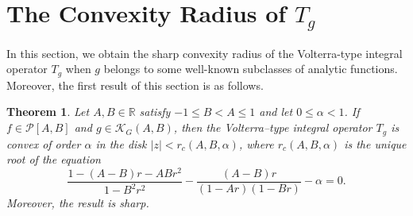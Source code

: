 \documentclass[12pt,a4paper]{amsart}
\numberwithin{equation}{section}
\newtheorem{theorem}{Theorem}[section]
\theoremstyle{remark}
\begin{document}
\section{The Convexity Radius of \texorpdfstring{$T_g$}{Tg}}\label{sec:convexity radius-T_f}
In this section, we obtain the sharp convexity radius of the Volterra-type integral operator $T_g$ when $g$ belongs to some well-known subclasses of analytic functions. 
Moreover, the first result of this section is as follows.
\begin{theorem}\label{thm:rad-convex-AB}
Let $A,B\in\mathbb{R}$ satisfy $-1\le B<A\le 1$ and let $0\le\alpha<1$. 
If $f\in\mathcal{P}[A,B]$ and $g\in\mathcal{K}_G(A,B)$, then the Volterra--type integral operator $T_g$
is convex of order $\alpha$ in the disk $|z|<r_c(A,B,\alpha)$, where \(r_c(A,B,\alpha)\) is the unique root of the equation
\begin{equation}\label{eq:root-equation}
\frac{1-(A-B)r-AB r^2}{1-B^2 r^2}-\frac{(A-B)r}{(1-A r)(1-B r)} - \alpha=0.
\end{equation}
Moreover, the result is sharp.
\end{theorem}
\end{document}
